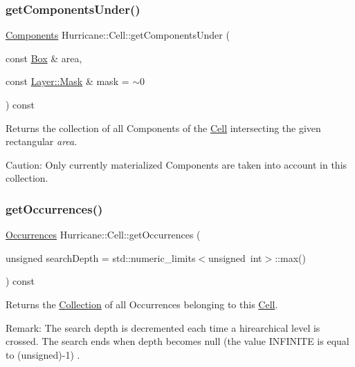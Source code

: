 \subsubsection{\texorpdfstring{get\+Components\+Under()}{getComponentsUnder()}}
{\footnotesize\ttfamily \mbox{\hyperlink{namespaceHurricane_a7d26d99aeb5dd6d70d51bd35d2473e72}{Components}} Hurricane\+::\+Cell\+::get\+Components\+Under (\begin{DoxyParamCaption}\item[{const \mbox{\hyperlink{classHurricane_1_1Box}{Box}} \&}]{area,  }\item[{const \mbox{\hyperlink{classHurricane_1_1Layer_af5277c670637bd5d910237e7afe01a91}{Layer\+::\+Mask}} \&}]{mask = {\ttfamily $\sim$0} }\end{DoxyParamCaption}) const}

Returns the collection of all Components of the \mbox{\hyperlink{classHurricane_1_1Cell}{Cell}} intersecting the given rectangular {\itshape area}.

\begin{DoxyParagraph}{Caution\+: Only currently materialized Components are taken into account}
in this collection. 
\end{DoxyParagraph}
\mbox{\label{classHurricane_1_1Cell_ab5bbab0a59106855d61deb94805e6115}} 
\subsubsection{\texorpdfstring{get\+Occurrences()}{getOccurrences()}}
{\footnotesize\ttfamily \mbox{\hyperlink{namespaceHurricane_a1912927c128eee859af62dbe4cbe0a6b}{Occurrences}} Hurricane\+::\+Cell\+::get\+Occurrences (\begin{DoxyParamCaption}\item[{unsigned}]{search\+Depth = {\ttfamily std\+:\+:numeric\+\_\+limits$<$unsigned~int$>$\+:\+:max()} }\end{DoxyParamCaption}) const}

Returns the \mbox{\hyperlink{classHurricane_1_1Collection}{Collection}} of all Occurrences belonging to this \mbox{\hyperlink{classHurricane_1_1Cell}{Cell}}.

\begin{DoxyParagraph}{Remark\+: The search depth is decremented each time a hirearchical}
level is crossed. The search ends when depth becomes null (the value {\ttfamily I\+N\+F\+I\+N\+I\+TE} is equal to {\ttfamily }(unsigned)-\/1) . 
\end{DoxyParagraph}
\mbox{\label{classHurricane_1_1Cell_a7fb09c8e350923c47ce4c4407bdb00ce}} 
